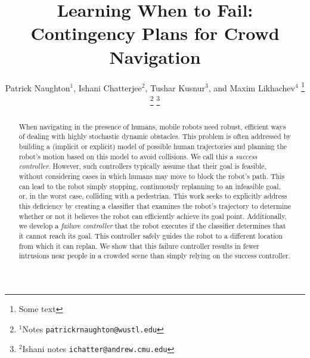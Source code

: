 \documentclass[letterpaper, 10 pt, conference]{ieeeconf}  %
\title{\LARGE \bf
	Learning When to Fail: Contingency Plans for Crowd Navigation
}
\author{Patrick Naughton$^{1}$, Ishani Chatterjee$^{2}$, Tushar Kusnur$^{3}$, and Maxim Likhachev$^{4}$%
\thanks{Some text}%
\thanks{$^{1}$Notes
        {\tt\small patrickrnaughton@wustl.edu}}%
\thanks{$^{2}$Ishani notes
        {\tt\small ichatter@andrew.cmu.edu}}%
}
\begin{document}
\newcolumntype{Z}{S[
	table-format=1.2,%
	round-mode=places,
	round-precision=2]}


\maketitle
\thispagestyle{empty}
\pagestyle{empty}


\begin{abstract}
	When navigating in the presence of humans, mobile robots need robust, efficient ways of dealing with highly stochastic dynamic obstacles. This problem is often addressed by building a (implicit or explicit) model of possible human trajectories and planning the robot's motion based on this model to avoid collisions. We call this a \textit{success controller}. However, such controllers typically assume that their goal is feasible, without considering cases in which humans may move to block the robot's path. This can lead to the robot simply stopping, continuously replanning to an infeasible goal, or, in the worst case, colliding with a pedestrian. This work seeks to explicitly address this deficiency by creating a classifier that examines the robot's trajectory to determine whether or not it believes the robot can efficiently achieve its goal point. Additionally, we develop a \textit{failure controller} that the robot executes if the classifier determines that it cannot reach its goal. This controller safely guides the robot to a different location from which it can replan. We show that this failure controller results in fewer intrusions near people in a crowded scene than simply relying on the success controller.
\end{abstract}


\end{document}
